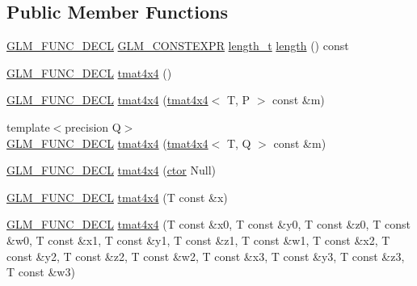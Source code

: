 \subsection*{Public Member Functions}
\begin{DoxyCompactItemize}
\item 
\hyperlink{setup_8hpp_ab2d052de21a70539923e9bcbf6e83a51}{G\+L\+M\+\_\+\+F\+U\+N\+C\+\_\+\+D\+E\+CL} \hyperlink{setup_8hpp_a08b807947b47031d3a511f03f89645ad}{G\+L\+M\+\_\+\+C\+O\+N\+S\+T\+E\+X\+PR} \hyperlink{namespaceglm_a090a0de2260835bee80e71a702492ed9}{length\+\_\+t} \hyperlink{structglm_1_1detail_1_1tmat4x4_a3904d82ee46ff5c6c343c704cc4894f2}{length} () const
\item 
\hyperlink{setup_8hpp_ab2d052de21a70539923e9bcbf6e83a51}{G\+L\+M\+\_\+\+F\+U\+N\+C\+\_\+\+D\+E\+CL} \hyperlink{structglm_1_1detail_1_1tmat4x4_a71d7b76eb0998b0a5e3a0b2fa180bdaa}{tmat4x4} ()
\item 
\hyperlink{setup_8hpp_ab2d052de21a70539923e9bcbf6e83a51}{G\+L\+M\+\_\+\+F\+U\+N\+C\+\_\+\+D\+E\+CL} \hyperlink{structglm_1_1detail_1_1tmat4x4_a10821dfc2a11592b00c0504964af9a30}{tmat4x4} (\hyperlink{structglm_1_1detail_1_1tmat4x4}{tmat4x4}$<$ T, P $>$ const \&m)
\item 
{\footnotesize template$<$precision Q$>$ }\\\hyperlink{setup_8hpp_ab2d052de21a70539923e9bcbf6e83a51}{G\+L\+M\+\_\+\+F\+U\+N\+C\+\_\+\+D\+E\+CL} \hyperlink{structglm_1_1detail_1_1tmat4x4_ad5f2b14d5f60c0b2b27ab28f7df8477b}{tmat4x4} (\hyperlink{structglm_1_1detail_1_1tmat4x4}{tmat4x4}$<$ T, Q $>$ const \&m)
\item 
\hyperlink{setup_8hpp_ab2d052de21a70539923e9bcbf6e83a51}{G\+L\+M\+\_\+\+F\+U\+N\+C\+\_\+\+D\+E\+CL} \hyperlink{structglm_1_1detail_1_1tmat4x4_af4e9ff77d235161a72c835f8609dd8e7}{tmat4x4} (\hyperlink{structglm_1_1detail_1_1tmat4x4_a314ae2df1758ddf97e2b024c32649cef}{ctor} Null)
\item 
\hyperlink{setup_8hpp_ab2d052de21a70539923e9bcbf6e83a51}{G\+L\+M\+\_\+\+F\+U\+N\+C\+\_\+\+D\+E\+CL} \hyperlink{structglm_1_1detail_1_1tmat4x4_a265d71ebfc8a91f1b8d9104933799f49}{tmat4x4} (T const \&x)
\item 
\hyperlink{setup_8hpp_ab2d052de21a70539923e9bcbf6e83a51}{G\+L\+M\+\_\+\+F\+U\+N\+C\+\_\+\+D\+E\+CL} \hyperlink{structglm_1_1detail_1_1tmat4x4_a4d793b3d9f54148c86334948d7eef97a}{tmat4x4} (T const \&x0, T const \&y0, T const \&z0, T const \&w0, T const \&x1, T const \&y1, T const \&z1, T const \&w1, T const \&x2, T const \&y2, T const \&z2, T const \&w2, T const \&x3, T const \&y3, T const \&z3, T const \&w3)

\end{DoxyCompactItemize}
